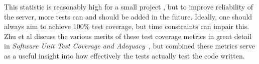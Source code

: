 This statistic is reasonably high for a small project , but to
improve reliability of the server, more tests can and should be added in the
future. Ideally, one should always aim to achieve 100\% test coverage, but
time constraints can impair this. Zhu et al discuss the various merits of
these test coverage metrics in great detail in \textit{Software Unit Test
Coverage and Adequacy}~\cite{zhu1997software}, but combined these metrics
serve as a useful insight into how effectively the tests actually test the
code written.

